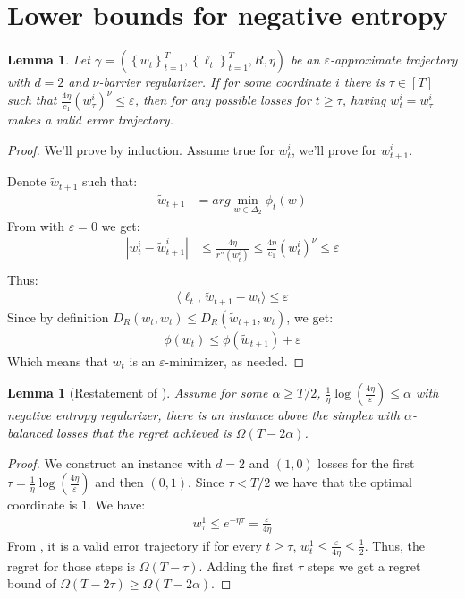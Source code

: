\documentclass[10pt]{article}
\newtheorem{lemma}[theorem]{Lemma}
\newtheorem*{lemma*}{Lemma}
\theoremstyle{definition}
\theoremstyle{remark}
\renewcommand{\epsilon}{\varepsilon}
\newcommand\inprod[2]{\langle #1,\,#2 \rangle}
\newcommand{\curly}[1]{ {\left\{ #1 \right\}}}
\newcommand{\roundy}[1]{ {\left( #1 \right)}}
\newcommand{\abs}[1]{ {\left | #1 \right |}}
\newcommand{\barconst}{\nu}
\begin{document}
\section{Lower bounds for negative entropy}\label{sec:simplex lower bounds}
\begin{lemma}\label{lem:stuck}
Let $\gamma = (\curly{w_t}_{t=1}^T, \curly{\ell_t}_{t=1}^T, R, \eta)$ be an $\epsilon$-approximate trajectory with $d=2$ and $\barconst$-barrier regularizer. If for some coordinate $i$ there is $\tau\in[T]$ such that $\frac{4\eta}{c_1} \roundy{w_\tau^i}^\barconst \le \epsilon$, then for any possible losses for $t\ge \tau$, having $w_{t}^i = w_\tau^i$ makes a valid error trajectory.
\end{lemma}
\begin{proof}
We'll prove by induction. Assume true for $w_t^i$, we'll prove for $w_{t+1}^i$.

Denote $\tilde{w}_{t+1}$ such that:
\begin{align*}
    \tilde{w}_{t+1} &= arg\min_{w\in\Delta_2}\phi_t(w)
\end{align*}
From  with $\epsilon = 0$ we get:
\begin{align*}
    \abs{w_t^i-\tilde{w}_{t+1}^i} &\le \frac{4\eta}{r''(w_t^i)} \le \frac{4\eta}{c_1} \roundy{w_t^i}^\barconst \le \epsilon\\
\end{align*}
Thus:
\begin{align*}
    \inprod{\ell_t}{\tilde{w}_{t+1}-w_t} \le \epsilon
\end{align*}
Since by definition $D_R(w_t,w_t) \le D_R(\tilde{w}_{t+1},w_t)$, we get:
\begin{align*}
    \phi(w_t) \le \phi(\tilde{w}_{t+1}) + \epsilon
\end{align*}
Which means that $w_t$ is an $\epsilon$-minimizer, as needed.
\end{proof}

\begin{lemma*}[Restatement of ]\label{lem:balance lower bound apx}
Assume for some $\alpha \ge T/2$, $\frac{1}{\eta}\log \roundy{\frac{4\eta}{\epsilon}} \le \alpha$ with negative entropy regularizer, there is an instance above the simplex with $\alpha$-balanced losses that the regret achieved is $\Omega\roundy{T-2\alpha}$.
\end{lemma*}
\begin{proof}
We construct an instance with $d=2$ and $(1,0)$ losses for the first $\tau = \frac{1}{\eta} \log \roundy{\frac{4\eta}{\epsilon}}$ and then $(0,1)$. Since $\tau < T/2$ we have that the optimal coordinate is $1$. We have:
\begin{align*}
    w_\tau^1 \le e^{-\eta\tau} = \frac{\epsilon}{4\eta}
\end{align*}
From , it is a valid error trajectory if for every $t\ge \tau$, $w_t^1 \le \frac{\epsilon}{4\eta} \le \frac{1}{2}$. Thus, the regret for those steps is $\Omega(T-\tau)$. Adding the first $\tau$ steps we get a regret bound of $\Omega(T-2\tau) \ge \Omega(T-2\alpha)$.
\end{proof}
\end{document}
